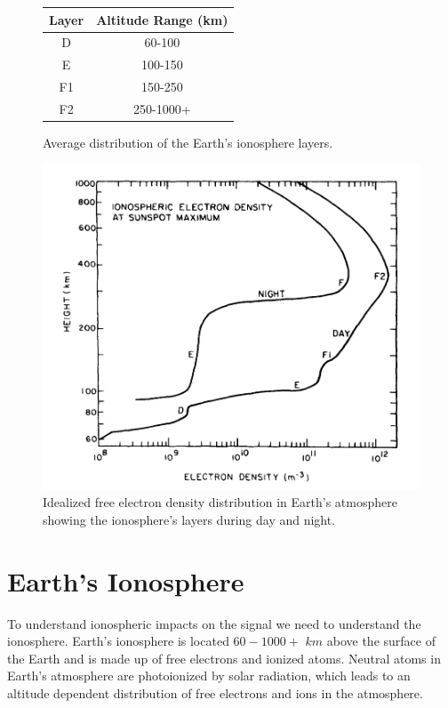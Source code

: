 \begin{figure}[htb]
\centering
\begin{minipage}[b]{0.48\textwidth}
\centering
\begin{tabular}{|c|c|}
\hline
Layer & Altitude Range (km) \\
\hline
D & 60-100 \\
\hline
E & 100-150 \\
\hline
F1 & 150-250 \\
\hline
F2 & 250-1000+ \\
\hline
\end{tabular}
\caption{Average distribution of the Earth's ionosphere layers.}
\label{Tab:iono_layer}
\vspace{2cm}
\end{minipage}%
\begin{minipage}[b]{0.02\textwidth}
\hspace{1cm}
\end{minipage}%
\begin{minipage}[b]{0.48\textwidth}
\centering
\includegraphics[width=0.95\linewidth]{Ionosphere/figures/atmosphere_layers.jpg}
\caption{Idealized free electron density distribution in Earth's atmosphere showing the ionosphere's layers during day and night. }
\label{Fig:iono_layer}
\end{minipage}
\end{figure}

\section{Earth's Ionosphere}
To understand ionospheric impacts on the \cm signal we need to understand the ionosphere. Earth's ionosphere is located $60 - 1000+$ $km$ above the surface of the Earth and is made up of free electrons and ionized atoms. Neutral atoms in Earth's atmosphere are photoionized by solar radiation, which leads to an altitude dependent distribution of free electrons and ions in the atmosphere.

